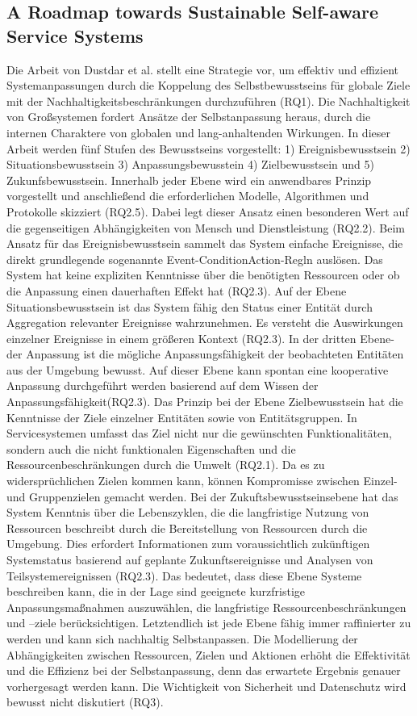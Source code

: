 \documentclass[conference,compsoc]{IEEEtran}
\begin{document}
\subsection{A Roadmap towards Sustainable Self-aware Service Systems}
Die Arbeit von Dustdar et al. \cite{dustdar2010roadmap} stellt eine Strategie vor, um effektiv und effizient Systemanpassungen  durch die Koppelung des Selbstbewusstseins für globale Ziele mit der Nachhaltigkeitsbeschränkungen durchzuführen (RQ1). Die Nachhaltigkeit von Gro{\ss}systemen fordert Ansätze der Selbstanpassung heraus, durch die internen Charaktere von globalen und lang-anhaltenden Wirkungen. In dieser Arbeit werden fünf Stufen des Bewusstseins vorgestellt: 1) Ereignisbewusstsein 2) Situationsbewusstsein 3) Anpassungsbewusstein 4) Zielbewusstsein und 5) Zukunfsbewusstsein. Innerhalb jeder Ebene wird ein anwendbares Prinzip vorgestellt und anschlie{\ss}end die erforderlichen Modelle, Algorithmen und Protokolle skizziert (RQ2.5). Dabei legt dieser Ansatz einen besonderen Wert auf die gegenseitigen Abhängigkeiten von Mensch und Dienstleistung (RQ2.2). Beim Ansatz für das Ereignisbewusstsein sammelt das System einfache Ereignisse, die direkt grundlegende sogenannte Event-ConditionAction-Regln auslösen. Das System hat keine expliziten Kenntnisse über die benötigten Ressourcen oder ob die Anpassung einen dauerhaften Effekt hat (RQ2.3). Auf der Ebene Situationsbewusstsein ist das System fähig den Status einer Entität durch Aggregation relevanter Ereignisse wahrzunehmen. Es versteht die Auswirkungen einzelner Ereignisse in einem grö{\ss}eren Kontext (RQ2.3). In der dritten Ebene- der Anpassung ist die mögliche Anpassungsfähigkeit der beobachteten Entitäten aus der Umgebung bewusst. Auf dieser Ebene kann spontan eine kooperative Anpassung durchgeführt werden basierend auf dem Wissen der Anpassungsfähigkeit(RQ2.3). Das Prinzip bei der Ebene Zielbewusstsein hat die Kenntnisse der Ziele einzelner Entitäten sowie von Entitätsgruppen. In Servicesystemen umfasst das Ziel nicht nur die gewünschten Funktionalitäten, sondern auch die nicht funktionalen Eigenschaften und die Ressourcenbeschränkungen durch die Umwelt (RQ2.1). Da es zu widersprüchlichen Zielen kommen kann, können Kompromisse zwischen Einzel- und Gruppenzielen gemacht werden. Bei der Zukuftsbewusstseinsebene hat das System Kenntnis über die Lebenszyklen, die die langfristige Nutzung von Ressourcen beschreibt durch die Bereitstellung von Ressourcen durch die Umgebung. Dies erfordert Informationen zum voraussichtlich zukünftigen Systemstatus basierend auf geplante Zukunftsereignisse und Analysen von Teilsystemereignissen (RQ2.3). Das bedeutet, dass diese Ebene Systeme beschreiben kann, die in der Lage sind geeignete kurzfristige Anpassungsma{\ss}nahmen auszuwählen, die langfristige Ressourcenbeschränkungen und –ziele berücksichtigen. Letztendlich ist jede Ebene fähig immer raffinierter zu werden und kann sich nachhaltig Selbstanpassen. Die Modellierung der Abhängigkeiten zwischen Ressourcen, Zielen und Aktionen erhöht die Effektivität und die Effizienz bei der Selbstanpassung, denn das erwartete Ergebnis genauer vorhergesagt werden kann. Die Wichtigkeit von Sicherheit und Datenschutz wird bewusst nicht diskutiert (RQ3).
\end{document}
